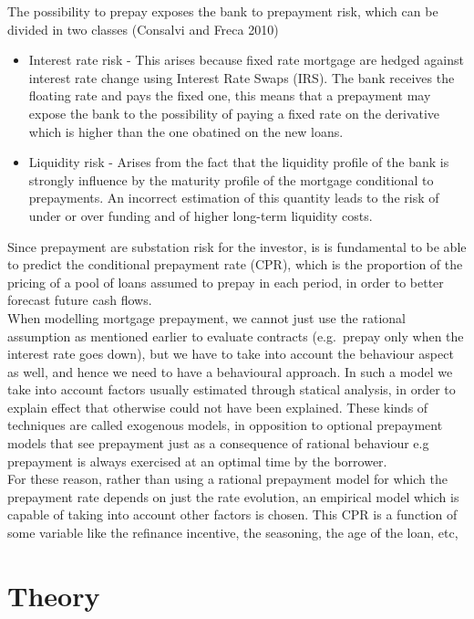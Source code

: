 \documentclass[12pt,twoside]{reedthesis}
\begin{document}
The possibility to prepay exposes the bank to prepayment risk, which can be divided in two classes (Consalvi and Freca 2010)
\begin{itemize}
\item
  Interest rate risk - This arises because fixed rate mortgage are hedged against interest rate change using Interest Rate Swaps (IRS). The bank receives the floating rate and pays the fixed one, this means that a prepayment may expose the bank to the possibility of paying a fixed rate on the derivative which is higher than the one obatined on the new loans.
\item
  Liquidity risk - Arises from the fact that the liquidity profile of the bank is strongly influence by the maturity profile of the mortgage conditional to prepayments. An incorrect estimation of this quantity leads to the risk of under or over funding and of higher long-term liquidity costs.
\end{itemize}
Since prepayment are substation risk for the investor, is is fundamental to be able to predict the conditional prepayment rate (CPR), which is the proportion of the pricing of a pool of loans assumed to prepay in each period, in order to better forecast future cash flows.\\
When modelling mortgage prepayment, we cannot just use the rational assumption as mentioned earlier to evaluate contracts (e.g.~prepay only when the interest rate goes down), but we have to take into account the behaviour aspect as well, and hence we need to have a behavioural approach. In such a model we take into account factors usually estimated through statical analysis, in order to explain effect that otherwise could not have been explained. These kinds of techniques are called exogenous models, in opposition to optional prepayment models that see prepayment just as a consequence of rational behaviour e.g prepayment is always exercised at an optimal time by the borrower.\\
For these reason, rather than using a rational prepayment model for which the prepayment rate depends on just the rate evolution, an empirical model which is capable of taking into account other factors is chosen. This CPR is a function of some variable like the refinance incentive, the seasoning, the age of the loan, etc,

\hypertarget{theory}{%
\chapter{Theory}\label{theory}}
\end{document}
